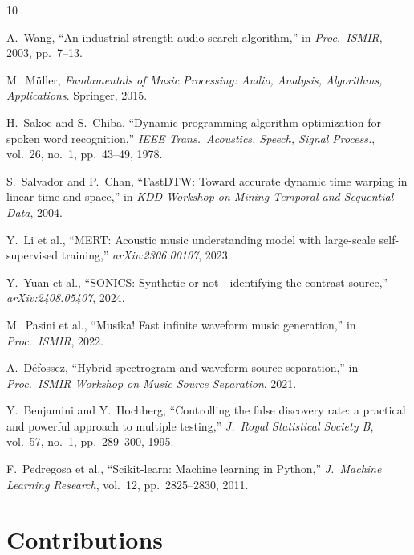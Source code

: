 \documentclass[12pt,a4paper]{article}
\begin{document}
\begin{thebibliography}{10}

A.\ Wang, ``An industrial-strength audio search algorithm,''
in \textit{Proc.\ ISMIR}, 2003, pp.\ 7--13.

M.\ M{\"u}ller, \textit{Fundamentals of Music Processing: Audio, Analysis,
Algorithms, Applications}. Springer, 2015.

H.\ Sakoe and S.\ Chiba, ``Dynamic programming algorithm optimization for
spoken word recognition,'' \textit{IEEE Trans.\ Acoustics, Speech, Signal
Process.}, vol.\ 26, no.\ 1, pp.\ 43--49, 1978.

S.\ Salvador and P.\ Chan, ``FastDTW: Toward accurate dynamic time warping in
linear time and space,'' in \textit{KDD Workshop on Mining Temporal and
Sequential Data}, 2004.

Y.\ Li et al., ``MERT: Acoustic music understanding model with large-scale
self-supervised training,'' \textit{arXiv:2306.00107}, 2023.

Y.\ Yuan et al., ``SONICS: Synthetic or not---identifying the contrast source,''
\textit{arXiv:2408.05407}, 2024.

M.\ Pasini et al., ``Musika! Fast infinite waveform music generation,''
in \textit{Proc.\ ISMIR}, 2022.

A.\ Défossez, ``Hybrid spectrogram and waveform source separation,''
in \textit{Proc.\ ISMIR Workshop on Music Source Separation}, 2021.

Y.\ Benjamini and Y.\ Hochberg, ``Controlling the false discovery rate: a
practical and powerful approach to multiple testing,'' \textit{J.\ Royal
Statistical Society B}, vol.\ 57, no.\ 1, pp.\ 289--300, 1995.

F.\ Pedregosa et al., ``Scikit-learn: Machine learning in Python,''
\textit{J.\ Machine Learning Research}, vol.\ 12, pp.\ 2825--2830, 2011.

\end{thebibliography}

\section{Contributions}
\label{sec:contributions}
\end{document}
